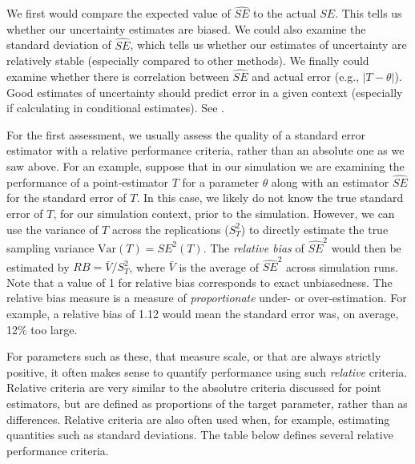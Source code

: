 \documentclass[
]{book}
\begin{document}
We first would compare the expected value of \(\widehat{SE}\) to the actual \(SE\).
This tells us whether our uncertainty estimates are biased.
We could also examine the standard deviation of \(\widehat{SE}\), which tells us whether our estimates of uncertainty are relatively stable (especially compared to other methods).
We finally could examine whether there is correlation between \(\widehat{SE}\) and actual error (e.g., \(\left|T - \theta \right|\)).
Good estimates of uncertainty should predict error in a given context (especially if calculating in conditional estimates).
See \cite{sundberg2003conditional}.

For the first assessment, we usually assess the quality of a standard error estimator with a relative performance criteria, rather than an absolute one as we saw above.
For an example, suppose that in our simulation we are examining the performance of a point-estimator \(T\) for a parameter \(\theta\) along with an estimator \(\widehat{SE}\) for the standard error of \(T\).
In this case, we likely do not know the true standard error of \(T\), for our simulation context, prior to the simulation.
However, we can use the variance of \(T\) across the replications (\(S_T^2\)) to directly estimate the true sampling variance \(\text{Var}(T) = SE^2(T)\).
The \emph{relative bias} of \(\widehat{SE}^2\) would then be estimated by \(RB = \bar{V} / S_T^2\), where \(\bar{V}\) is the average of \(\widehat{SE}^2\) across simulation runs.
Note that a value of 1 for relative bias corresponds to exact unbiasedness.
The relative bias measure is a measure of \emph{proportionate} under- or over-estimation.
For example, a relative bias of 1.12 would mean the standard error was, on average, 12\% too large.

For parameters such as these, that measure scale, or that are always strictly positive, it often makes sense to quantify performance using such \emph{relative} criteria.
Relative criteria are very similar to the absolutre criteria discussed for point estimators, but are defined as proportions of the target parameter, rather than as differences.
Relative criteria are also often used when, for example, estimating quantities such as standard deviations.
The table below defines several relative performance criteria.
\end{document}
